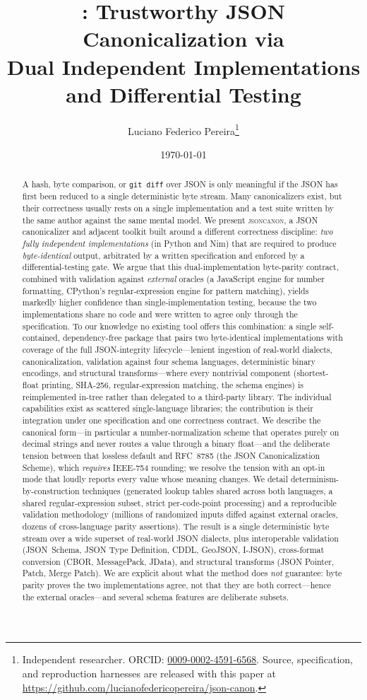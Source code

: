 \documentclass[11pt]{article}
\title{\tool{}: Trustworthy JSON Canonicalization via\\
       Dual Independent Implementations and Differential Testing}
\author{Luciano Federico Pereira\thanks{Independent researcher.
  ORCID: \href{https://orcid.org/0009-0002-4591-6568}{0009-0002-4591-6568}.
  Source, specification, and reproduction harnesses are released with this paper at
  \url{https://github.com/lucianofedericopereira/json-canon}.}}
\date{\today}
\newcommand{\tool}{\textsc{jsoncanon}}
\newcommand{\code}[1]{\texttt{#1}}
\begin{document}
\maketitle

\begin{abstract}
A hash, byte comparison, or \code{git diff} over JSON is only meaningful if the
JSON has first been reduced to a single deterministic byte stream. Many
canonicalizers exist, but their correctness usually rests on a single
implementation and a test suite written by the same author against the same
mental model. We present \tool{}, a JSON canonicalizer and adjacent toolkit
built around a different correctness discipline: \emph{two fully independent
implementations} (in Python and Nim) that are required to produce
\emph{byte-identical} output, arbitrated by a written specification and enforced
by a differential-testing gate. We argue that this dual-implementation
byte-parity contract, combined with validation against \emph{external} oracles
(a JavaScript engine for number formatting, CPython's regular-expression engine
for pattern matching), yields markedly higher confidence than single-implementation
testing, because the two implementations share no code and were written to agree
only through the specification. To our knowledge no existing tool offers this
combination: a single self-contained, dependency-free package that pairs two
byte-identical implementations with coverage of the full JSON-integrity
lifecycle---lenient ingestion of real-world dialects, canonicalization,
validation against four schema languages, deterministic binary encodings, and
structural transforms---where every nontrivial component (shortest-float
printing, SHA-256, regular-expression matching, the schema engines) is
reimplemented in-tree rather than delegated to a third-party library. The
individual capabilities exist as scattered single-language libraries; the
contribution is their integration under one specification and one correctness
contract. We describe the canonical form---in particular a
number-normalization scheme that operates purely on decimal strings and never
routes a value through a binary float---and the deliberate tension between that
lossless default and RFC~8785 (the JSON Canonicalization Scheme), which
\emph{requires} IEEE-754 rounding; we resolve the tension with an opt-in mode
that loudly reports every value whose meaning changes. We detail
determinism-by-construction techniques (generated lookup tables shared across
both languages, a shared regular-expression subset, strict per-code-point
processing) and a reproducible validation methodology (millions of randomized
inputs diffed against external oracles, dozens of cross-language parity
assertions). The result is a single deterministic byte stream over a wide
superset of real-world JSON dialects, plus interoperable validation
(JSON~Schema, JSON Type Definition, CDDL, GeoJSON, I-JSON), cross-format
conversion (CBOR, MessagePack, JData), and structural transforms (JSON Pointer,
Patch, Merge Patch). We are explicit about what the method does \emph{not}
guarantee: byte parity proves the two implementations agree, not that they are
both correct---hence the external oracles---and several schema features are
deliberate subsets.
\end{abstract}
\end{document}
